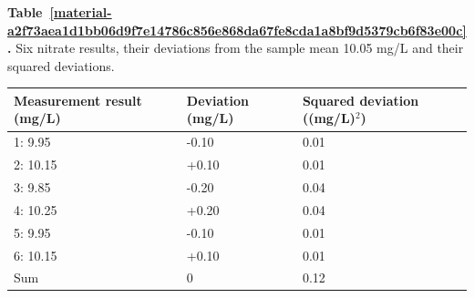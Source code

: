 \documentclass[11pt,a4paper]{article}
\newcounter{scripttable}
\begin{document}
\par\medskip
{}
\label{material-a2f73aea1d1bb06d9f7e14786c856e868da67fe8cda1a8bf9d5379cb6f83e00c}
\noindent\textbf{Table~\ref*{material-a2f73aea1d1bb06d9f7e14786c856e868da67fe8cda1a8bf9d5379cb6f83e00c}.} Six nitrate results, their deviations from the sample mean 10.05 mg/L and their squared deviations.\par\nopagebreak
\begin{longtable}{@{}p{}p{}p{}@{}}
Measurement result (mg/L) & Deviation (mg/L) & Squared deviation ((mg/L)\ensuremath{{}^2}) \\ \hline
\endhead
1: 9.95 & -0.10 & 0.01 \\ \hline
2: 10.15 & +0.10 & 0.01 \\ \hline
3: 9.85 & -0.20 & 0.04 \\ \hline
4: 10.25 & +0.20 & 0.04 \\ \hline
5: 9.95 & -0.10 & 0.01 \\ \hline
6: 10.15 & +0.10 & 0.01 \\ \hline
Sum & 0 & 0.12 \\ \hline
\end{longtable}
\medskip
\end{document}
